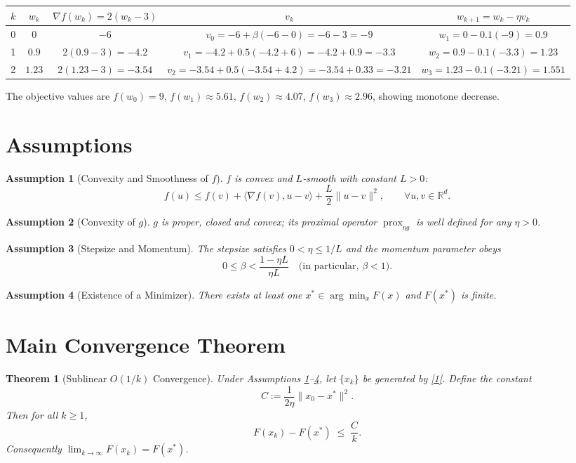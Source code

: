 \documentclass{article}
\newtheorem{theorem}{Theorem}
\newtheorem{assumption}{Assumption}
\newcommand{\prox}{\operatorname{prox}}
\newcommand{\R}{\mathbb{R}}
\begin{document}
\begin{center}
\begin{tabular}{c|c|c|c|c}
$k$ & $w_{k}$ & $\nabla f(w_{k})=2(w_{k}-3)$ & $v_{k}$ & $w_{k+1}=w_{k}-\eta v_{k}$\\ \hline
0 & $0$ & $-6$ & $v_{0}= -6+\beta(-6-0)= -6-3 = -9$ & $w_{1}=0-0.1(-9)=0.9$\\[4pt]
1 & $0.9$ & $2(0.9-3)=-4.2$ & $v_{1}= -4.2+0.5(-4.2+6)= -4.2+0.9 = -3.3$ & $w_{2}=0.9-0.1(-3.3)=1.23$\\[4pt]
2 & $1.23$ & $2(1.23-3)=-3.54$ & $v_{2}= -3.54+0.5(-3.54+4.2)= -3.54+0.33 = -3.21$ & $w_{3}=1.23-0.1(-3.21)=1.551$\\
\end{tabular}
\end{center}
The objective values are $f(w_{0})=9$, $f(w_{1})\approx5.61$, $f(w_{2})\approx4.07$, $f(w_{3})\approx2.96$, showing monotone decrease.

\section*{Assumptions}
\begin{assumption}[Convexity and Smoothness of $f$]\label{as:convexsmooth}
$f$ is convex and $L$‑smooth with constant $L>0$:
\[
f(u)\le f(v)+\langle\nabla f(v),u-v\rangle+\frac{L}{2}\|u-v\|^{2},\qquad\forall u,v\in\R^{d}.
\]
\end{assumption}
\begin{assumption}[Convexity of $g$]\label{as:gconvex}
$g$ is proper, closed and convex; its proximal operator $\prox_{\eta g}$ is well defined for any $\eta>0$.
\end{assumption}
\begin{assumption}[Stepsize and Momentum]\label{as:params}
The stepsize satisfies $0<\eta\le 1/L$ and the momentum parameter obeys
\[
0\le\beta<\frac{1-\eta L}{\eta L}\quad\text{(in particular, }\beta<1\text{)}.
\]
\end{assumption}
\begin{assumption}[Existence of a Minimizer]\label{as:opt}
There exists at least one $x^{*}\in\arg\min_{x}F(x)$ and $F(x^{*})$ is finite.
\end{assumption}

\section*{Main Convergence Theorem}
\begin{theorem}[Sublinear $O(1/k)$ Convergence]\label{thm:sublinear}
Under Assumptions \ref{as:convexsmooth}–\ref{as:opt}, let $\{x_{k}\}$ be generated by \eqref{1}.  
Define the constant
\[
C:=\frac{1}{2\eta}\|x_{0}-x^{*}\|^{2}.
\]
Then for all $k\ge1$,
\[
F(x_{k})-F(x^{*})\;\le\;\frac{C}{k}.
\tag{2}
\]
Consequently $\displaystyle\lim_{k\to\infty}F(x_{k})=F(x^{*})$.
\end{theorem}
\end{document}
